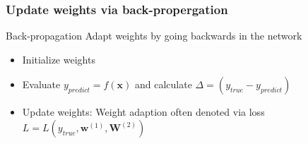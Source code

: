 \documentclass{beamer}
\begin{document}
\begin{frame}
    \frametitle{Update weights via back-propergation}
    \begin{block}{Back-propagation}
        Adapt weights by going backwards in the network
        \begin{itemize}
            \item<1-> Initialize weights
            \item<2-> Evaluate $y_{predict} = f(\boldsymbol{x})$ and calculate $\Delta = (y_{true} - y_{predict})$
            \item<3-> Update weights: Weight adaption often denoted via loss $L = L(y_{true},\boldsymbol{w}^{(1)},\boldsymbol{W}^{(2)})$
        \end{itemize}
    \end{block} 
    \vspace*{3mm}
    \centering{}
\end{frame}


\end{document}
